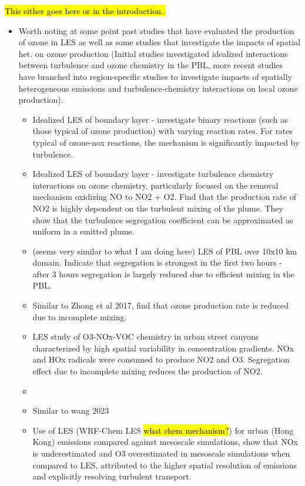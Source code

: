 \hl{This either goes here or in the introduction..}
\begin{itemize}
\item Worth noting at some point past studies that have evaluated the production of ozone in LES as well as some studies that investigate the impacts of spatial het. on ozone production (Initial studies investigated idealized interactions between turbulence and ozone chemistry in the PBL, more recent studies have branched into region-specific studies to investigate impacts of spatially heterogeneous emissions and turbulence-chemistry interactions on local ozone production).
\begin{itemize}
\item \cite{schumann_large-eddy_1989} Idealized LES of boundary layer - investigate binary reactions (such as those typical of ozone production) with varying reaction rates. For rates typical of ozone-nox reactions, the mechanism is significantly impacted by turbulence.
\item \cite{sykes_large-eddy_1992} Idealized LES of boundary layer - investigate turbulence chemistry interactions on ozone chemistry, particularly focused on the removal mechanism oxidizing NO to NO2 + O2. Find that the production rate of NO2 is highly dependent on the turbulent mixing of the plume. They show that the turbulence segregation coefficient can be approximated as uniform in a emitted plume. 
\item \cite{auger_chemical_2007} (seems very similar to what I am doing here) LES of PBL over 10x10 km domain. Indicate that segregation is strongest in the first two hours - after 3 hours segregation is largely reduced due to efficient mixing in the PBL. 
\item \cite{zhong_modelling_2015} Similar to Zhong et al 2017, find that ozone production rate is reduced due to incomplete mixing.
\item \cite{zhong_large_2017} LES study of O3-NOx-VOC chemistry in urban street canyons characterized by high spatial variability in concentration gradients. NOx and HOx radicals were consumed to produce NO2 and O3. Segregation effect due to incomplete mixing reduces the production of NO2. 
\item \cite{wang_impact_2021}
\item \cite{wang_segregation_2022} Similar to wang 2023
\item \cite{wang_coupled_2023} Use of LES (WRF-Chem LES \hl{what chem mechanism?}) for urban (Hong Kong) emissions compared against mesoscale simulations, show that NOx is underestimated and O3 overestimated in mesoscale simulations when compared to LES, attributed to the higher spatial resolution of emissions and explicitly resolving turbulent transport.
\end{itemize} 
\end{itemize}




